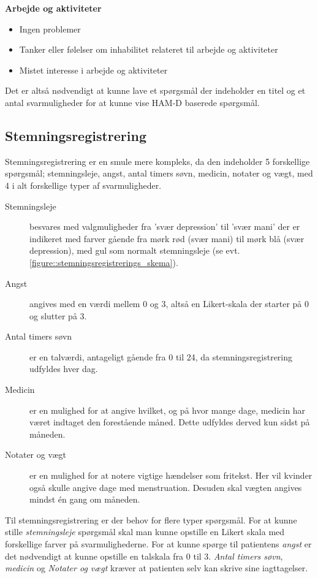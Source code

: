\textbf{Arbejde og aktiviteter}
\begin{itemize}
\item Ingen problemer
\item Tanker eller følelser om inhabilitet relateret til arbejde og aktiviteter
\item Mistet interesse i arbejde og aktiviteter 
\end{itemize}

\noindent
Det er altså nødvendigt at kunne lave et spørgsmål der indeholder en titel og et antal svarmuligheder for at kunne vise HAM-D baserede spørgsmål.

\subsection{Stemningsregistrering}\label{krav:stemningsregistrering}
Stemningsregistrering er en smule mere kompleks, da den indeholder 5 forskellige spørgsmål; stemningsleje, angst, antal timers søvn, medicin, notater og vægt, med 4 i alt forskellige typer af svarmuligheder.

\begin{description}
\item[Stemningsleje] besvares med valgmuligheder fra 'svær depression' til 'svær mani' der er indikeret med farver gående fra mørk rød (svær mani) til mørk blå (svær depression), med gul som normalt stemningsleje (se evt. \cref{figure::stemningsregistrerings_skema}).

\item[Angst] angives med en værdi mellem 0 og 3, altså en Likert-skala der starter på 0 og slutter på 3.

\item[Antal timers søvn] er en talværdi, antageligt gående fra 0 til 24, da stemningsregistrering udfyldes hver dag.

\item[Medicin] er en mulighed for at angive hvilket, og på hvor mange dage, medicin har været indtaget den forestående måned.
Dette udfyldes derved kun sidst på måneden.

\item[Notater og vægt] er en mulighed for at notere vigtige hændelser som fritekst.
Her vil kvinder også skulle angive dage med menstruation.
Desuden skal vægten angives mindst én gang om måneden.
\end{description}

Til stemningsregistrering er der behov for flere typer spørgsmål.
For at kunne stille \emph{stemningsleje} spørgsmål skal man kunne opstille en Likert skala med forskellige farver på svarmulighederne.
For at kunne spørge til patientens \emph{angst} er det nødvendigt at kunne opstille en talskala fra 0 til 3.
\emph{Antal timers søvn}, \emph{medicin} og \emph{Notater og vægt} kræver at patienten selv kan skrive sine iagttagelser.

